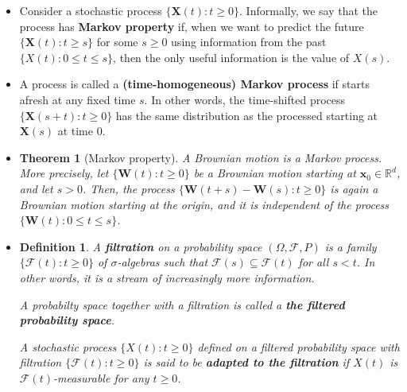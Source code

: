 \documentclass[10pt]{article}
\newtheorem{theorem}[lemma]{Theorem}
\newtheorem{definition}[lemma]{Definition}
\newcommand{\ve}[1]{\mathbf{#1}}
\newcommand{\mcal}[1]{\mathcal{#1}}
\newcommand{\Real}{\mathbb{R}}
\begin{document}
\begin{itemize}
  \item Consider a stochastic process $\{ \ve{X}(t) : t \geq 0 \}$. Informally, we say that the process has {\bf Markov property} if, when we want to predict the future $\{ \ve{X}(t) : t \geq s \}$ for some $s \geq 0$ using information from the past $\{ X(t) : 0 \leq t \leq s \}$, then the only useful information is the value of $X(s)$.
  
  \item A process is called a {\bf (time-homogeneous) Markov process} if starts afresh at any fixed time $s$. In other words, the time-shifted process $\{ \ve{X}(s+t) : t \geq 0 \}$ has the same distribution as the processed starting at $\ve{X}(s)$ at time $0$.
  
  \item \begin{theorem}[Markov property] \label{thm:markov-property}
    A Brownian motion is a Markov process. More precisely, let $\{\ve{W}(t) : t \geq 0\}$ be a Brownian motion starting at $\ve{x}_0 \in \Real^d$, and let $s > 0$. Then, the process $\{ \ve{W}(t+s) - \ve{W}(s) : t \geq 0\}$ is again a Brownian motion starting at the origin, and it is independent of the process $\{ \ve{W}(t) : 0 \leq t \leq s \} $.
  \end{theorem}

  \item \begin{definition}
    A {\bf filtration} on a probability space $(\Omega, \mcal{F}, P)$ is a family $\{ \mcal{F}(t): t \geq 0 \}$ of $\sigma$-algebras such that $\mcal{F}(s) \subseteq \mcal{F}(t)$ for all $s < t$. In other words, it is a stream of increasingly more information.
    
    A probabilty space together with a filtration is called a {\bf the filtered probability space}. 
    
    A stochastic process $\{X(t): t \geq 0\}$ defined on a filtered probability space with filtration $\{ \mcal{F}(t): t \geq 0 \}$ is said to be {\bf adapted to the filtration} if $X(t)$ is $\mcal{F}(t)$-measurable for any $t \geq 0$. 
  \end{definition}

\begin{comment}
  \item Let $\ve{W}(t)$ be a Brownian motion defined on a probabilty space $(\Omega,\mcal{F},P)$. We can define a filtration
  \begin{align*}
    \mcal{F}^0(t) = \sigma(W(s) : 0 \leq s \leq t) = \sigma\bigg( \bigcup_{0\leq s \leq t} \sigma(\ve{W}(s)) \bigg)
  \end{align*}
  to be the $\sigma$-algebra generated by the random variables $\ve{W}(s)$ for $0 \leq s \leq t$. We have that the Brownian motion is adapted to the filtration. The Markov property says that $\{ \ve{W}(t+s) - \ve{W}(s) : t \geq 0 \}$ is independent of $\mcal{F}^0(s)$.


\end{comment}
\end{itemize}
\end{document}

